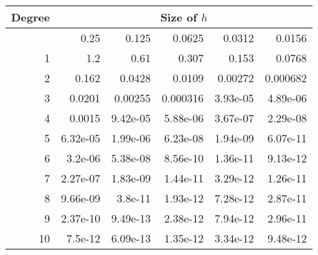 \begin{tabular}{|r|r|r|r|r|r|}    
    \hline
    Degree &        \multicolumn{5}{c|}{Size of $h$}          \\
    \hline
       & 0.25     & 0.125    & 0.0625   & 0.0312   & 0.0156   \\
    \hline
 1  & 1.2      & 0.61     & 0.307    & 0.153    & 0.0768   \\
    \hline
 2  & 0.162    & 0.0428   & 0.0109   & 0.00272  & 0.000682 \\
    \hline
 3  & 0.0201   & 0.00255  & 0.000316 & 3.93e-05 & 4.89e-06 \\
    \hline
 4  & 0.0015   & 9.42e-05 & 5.88e-06 & 3.67e-07 & 2.29e-08 \\
    \hline
 5  & 6.32e-05 & 1.99e-06 & 6.23e-08 & 1.94e-09 & 6.07e-11 \\
    \hline
 6  & 3.2e-06  & 5.38e-08 & 8.56e-10 & 1.36e-11 & 9.13e-12 \\
    \hline
 7  & 2.27e-07 & 1.83e-09 & 1.44e-11 & 3.29e-12 & 1.26e-11 \\
    \hline
 8  & 9.66e-09 & 3.8e-11  & 1.93e-12 & 7.28e-12 & 2.87e-11 \\
    \hline
 9  & 2.37e-10 & 9.49e-13 & 2.38e-12 & 7.94e-12 & 2.96e-11 \\
    \hline
 10 & 7.5e-12  & 6.09e-13 & 1.35e-12 & 3.34e-12 & 9.48e-12 \\
\hline
\end{tabular}